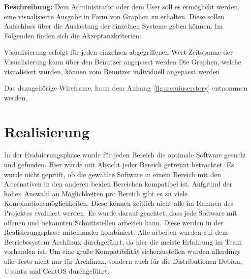 \textbf{Beschreibung:} Dem Administrator oder dem User soll es ermöglicht
werden, eine visualisierte Ausgabe in Form von Graphen zu erhalten. Diese
sollen Aufschluss über die Auslastung der einzelnen Systeme geben können. Im
Folgenden finden sich die Akzeptanzkriterien:

\begin{outline}
  \1 Visualisierung erfolgt für jeden einzelnen abgegriffenen Wert
  \1 Zeitspanne der Visualisierung kann über den Benutzer angepasst werden
  \1 Die Graphen, welche visualisiert wurden, können vom Benutzer individuell
  angepasst werden
\end{outline}

Das dazugehörige Wireframe, kann dem Anhang~\ref{figure:uiuserstory}
entnommen werden.
\mr%

\chapter{Realisierung}
In der Evaluierungsphase wurde für jeden Bereich die optimale Software gesucht
und gefunden. Hier wurde mit Absicht jeder Bereich getrennt betrachtet. Es
wurde nicht geprüft, ob die gewählte Software in einem Bereich mit den
Alternativen in den anderen beiden Bereichen kompatibel ist. Aufgrund der hohen
Auswahl an Möglichkeiten pro Bereich gibt es zu viele
Kombinationsmöglichkeiten. Diese können zeitlich nicht alle im Rahmen des
Projektes evaluiert werden. Es wurde darauf geachtet, dass jede Software mit
offenen und bekannten Schnittstellen arbeiten kann. Diese werden in der
Realisierungsphase miteinander kombiniert. Alle arbeiten wurden auf dem
Betriebssystem Archlinux durchgeführt, da hier die meiste Erfahrung im Team
vorhanden ist. Um eine große Kompatibilität sicherzustellen wurden allerdings
alle Tests nicht nur für Archlinux, sondern auch für die Distributionen Debian,
Ubuntu und CentOS durchgeführt.
\all%


